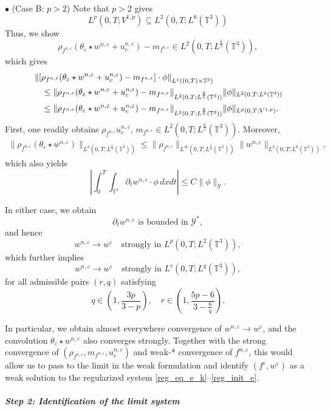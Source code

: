 \documentclass[10pt,reqno]{amsart}
\numberwithin{equation}{section}
\newcommand{\T}{\mathbb T}
\newcommand{\e}{\varepsilon}
\newcommand{\lt}{\left}
\newcommand{\rt}{\right}
\begin{document}
\noindent $\bullet$ (Case B: $p>2$) Note that $p>2$ gives
\[
L^p(0,T;V^{1,p}) \subseteq L^2(0,T;L^6(\T^3))
\]
Thus, we show 
\[
\rho_{f^{n,\e}} (\theta_\e \star  w^{n,\e}+u_c^{n,\e})-m_{f^{n,\e}} \in L^2(0,T;L^{\frac 65}(\T^3)),
\]
which gives
\[\begin{aligned}
&\lt\| [\rho_{f^{n,\e}} (\theta_\e \star  w^{n,\e}+u_c^{n,\e})-m_{f^{n,\e}}] \cdot \phi \rt\|_{L^1((0,T)\times\T^3)} \cr
 &\quad \le \|\rho_{f^{n,\e}} (\theta_\e \star  w^{n,\e}+u_c^{n,\e})-m_{f^{n,\e}}\|_{L^2(0,T;L^{\frac65 }(\T^3))}\|\phi\|_{L^2(0,T;L^6(\T^3))}\\
&\quad \le  \|\rho_{f^{n,\e}} (\theta_\e \star  w^{n,\e}+u_c^{n,\e})-m_{f^{n,\e}}\|_{L^2(0,T;L^{\frac65 }(\T^3))}\|\phi\|_{L^p(0,T;V^{1,p})}.
\end{aligned}\]
First, one readily obtains  $\rho_{f^{n,\e}} u_c^{n,\e}$, $m_{f^{n,\e}} \in L^2(0,T;L^{\frac65}(\T^3))$. Moreover,
\[\begin{aligned}
\|\rho_{f^{n,\e}} (\theta_\e \star w^{n,\e})\|_{L^2(0,T;L^{\frac65 }(\T^3))} \le \|\rho_{f^{n,\e}}\|_{L^\infty(0,T;L^{\frac32}(\T^3))}\|w^{n,\e}\|_{L^2(0,T;L^6(\T^3))},
\end{aligned}\]
which also yields
\[
\left| \int_0^T \int_{\T^3} \partial_t w^{n,\e} \cdot \phi\,dxdt \right| \le C \|\phi\|_{\mathcal{Y}}.
\]

In either case, we obtain
\[
\partial_t w^{n,\e} \text{ is bounded in } \mathcal{Y}^*,
\]
and hence
\[\label{wne_lrlq}
w^{n,\e} \to w^\e \quad \text{strongly in } L^p(0,T;L^2(\T^3)),
\]
which further implies
\begin{equation}\label{w_str_range}
w^{n,\e} \to w^\e \quad \text{strongly in } L^r(0,T;L^q(\T^3)),
\end{equation}
for all admissible pairs $(r,q)$ satisfying
\[
q \in \left(1, \frac{3p}{3-p}\right), \quad r \in \left(1, \frac{5p - 6}{3 - \frac{6}{q}}\right).
\]

In particular, we obtain almost everywhere convergence of $w^{n,\e} \to w^\e$, and the convolution $\theta_\e \star w^{n,\e}$ also converges strongly. Together with the strong convergence of $(\rho_{f^{n,\e}}, m_{f^{n,\e}}, u_c^{n,\e})$ and weak-* convergence of $f^{n,\e}$, this would allow us to pass to the limit in the weak formulation and identify $(f^\e, w^\e)$ as a weak solution to the regularized system \eqref{reg_eq_e_k}--\eqref{reg_init_e}. 

\medskip

\paragraph{\it Step 2: Identification of the limit system}
\end{document}
